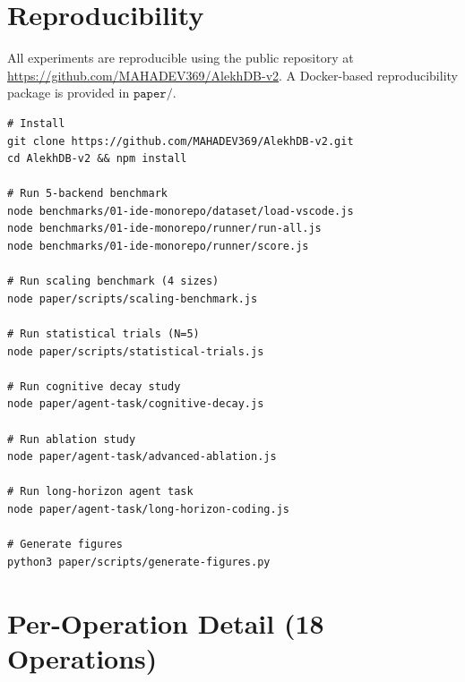 \appendix

\section{Reproducibility}

All experiments are reproducible using the public repository at \url{https://github.com/MAHADEV369/AlekhDB-v2}. A Docker-based reproducibility package is provided in $\texttt{paper/}$.

\begin{verbatim}
# Install
git clone https://github.com/MAHADEV369/AlekhDB-v2.git
cd AlekhDB-v2 && npm install

# Run 5-backend benchmark
node benchmarks/01-ide-monorepo/dataset/load-vscode.js
node benchmarks/01-ide-monorepo/runner/run-all.js
node benchmarks/01-ide-monorepo/runner/score.js

# Run scaling benchmark (4 sizes)
node paper/scripts/scaling-benchmark.js

# Run statistical trials (N=5)
node paper/scripts/statistical-trials.js

# Run cognitive decay study
node paper/agent-task/cognitive-decay.js

# Run ablation study
node paper/agent-task/advanced-ablation.js

# Run long-horizon agent task
node paper/agent-task/long-horizon-coding.js

# Generate figures
python3 paper/scripts/generate-figures.py
\end{verbatim}

\section{Per-Operation Detail (18 Operations)}


